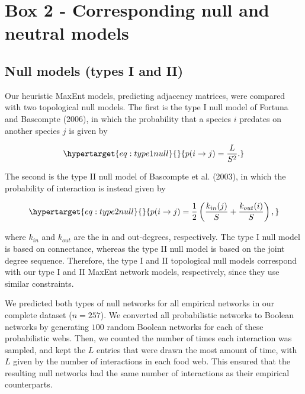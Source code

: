 \documentclass[11pt]{article}
\begin{document}
\hypertarget{box-2---corresponding-null-and-neutral-models}{%
\section{Box 2 - Corresponding null and neutral
models}\label{box-2---corresponding-null-and-neutral-models}}

\hypertarget{null-models-types-i-and-ii}{%
\subsection{Null models (types I and
II)}\label{null-models-types-i-and-ii}}

Our heuristic MaxEnt models, predicting adjacency matrices, were
compared with two topological null models. The first is the type I null
model of Fortuna and Bascompte (2006), in which the probability that a
species \(i\) predates on another species \(j\) is given by

\begin{equation}\protect\hypertarget{eq:type1null}{}{p(i \rightarrow j) = \frac{L}{S^2}.}\label{eq:type1null}\end{equation}

The second is the type II null model of Bascompte et al. (2003), in
which the probability of interaction is instead given by

\begin{equation}\protect\hypertarget{eq:type2null}{}{p(i \rightarrow j) = \frac{1}{2} \left(\frac{k_{in}(j)}{S} + \frac{k_{out}(i)}{S}\right),}\label{eq:type2null}\end{equation}

where \(k_{in}\) and \(k_{out}\) are the in and out-degrees,
respectively. The type I null model is based on connectance, whereas the
type II null model is based on the joint degree sequence. Therefore, the
type I and II topological null models correspond with our type I and II
MaxEnt network models, respectively, since they use similar constraints.

We predicted both types of null networks for all empirical networks in
our complete dataset (\(n = 257\)). We converted all probabilistic
networks to Boolean networks by generating \(100\) random Boolean
networks for each of these probabilistic webs. Then, we counted the
number of times each interaction was sampled, and kept the \(L\) entries
that were drawn the most amount of time, with \(L\) given by the number
of interactions in each food web. This ensured that the resulting null
networks had the same number of interactions as their empirical
counterparts.
\end{document}
